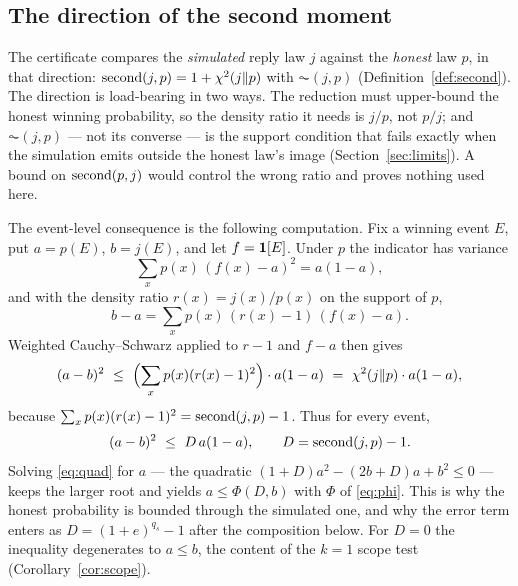 \subsection{The direction of the second moment}\label{sec:direction}
The certificate compares the \emph{simulated} reply law $j$ against the
\emph{honest} law $p$, in that direction:
$\operatorname{second}(j,p)=1+\chi^2(j\Vert p)$ with $\AC(j,p)$
(Definition~\ref{def:second}). The direction is load-bearing in two
ways. The reduction must upper-bound the honest winning probability,
so the density ratio it needs is $j/p$, not $p/j$; and
$\AC(j,p)$ --- not its converse --- is the support condition that fails
exactly when the simulation emits outside the honest law's image
(Section~\ref{sec:limits}). A bound on $\operatorname{second}(p,j)$ would control the
wrong ratio and proves nothing used here.

The event-level consequence is the following computation. Fix a
winning event $E$, put $a=p(E)$, $b=j(E)$, and let $f=\mathbf{1}[E]$. Under
$p$ the indicator has variance
\[
 \sum_x p(x)\,(f(x)-a)^2 = a(1-a),
\]
and with the density ratio $r(x)=j(x)/p(x)$ on the support of $p$,
\[
 b-a=\sum_x p(x)\,(r(x)-1)\,(f(x)-a).
\]
Weighted Cauchy--Schwarz applied to $r-1$ and $f-a$ then gives
\[
 (a-b)^2\ \leq\ \Bigl(\sum_x p(x)(r(x)-1)^2\Bigr)\cdot a(1-a)
 \ =\ \chi^2(j\Vert p)\cdot a(1-a),
\]
because $\sum_x p(x)(r(x)-1)^2 = \operatorname{second}(j,p)-1$. Thus for every event,
\begin{equation}\label{eq:quad}
 (a-b)^2\ \leq\ D\,a(1-a),\qquad D=\operatorname{second}(j,p)-1.
\end{equation}
Solving \eqref{eq:quad} for $a$ --- the quadratic
$(1+D)a^2-(2b+D)a+b^2\leq 0$ --- keeps the larger root and yields
$a\leq\Phi(D,b)$ with $\Phi$ of \eqref{eq:phi}. This is why the honest
probability is bounded through the simulated one, and why the error
term enters as $D=(1+e)^{q_s}-1$ after the composition below. For
$D=0$ the inequality degenerates to $a\leq b$, the content of the
$k=1$ scope test (Corollary~\ref{cor:scope}).

